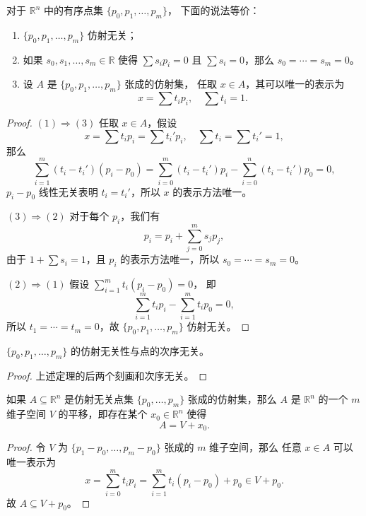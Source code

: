 \documentclass[fontset=none]{Notes}
\begin{document}
\begin{theorem}
  对于 $\mathbb{R}^n$ 中的有序点集 $\{p_0,p_1,\dots,p_m\}$，
  下面的说法等价：
  \begin{enumerate}
    \item $\{p_0,p_1,\dots,p_m\}$ 仿射无关；
    \item 如果 $s_0,s_1,\dots,s_m\in \mathbb{R}$ 使得
    $\sum s_ip_i=0$ 且 $\sum s_i=0$，那么 $s_0=\cdots=s_m=0$。
    \item 设 $A$ 是 $\{p_0,p_1,\dots,p_m\}$ 张成的仿射集，
    任取 $x\in A$，其可以唯一的表示为
    \[
      x=\sum t_ip_i,\quad \sum t_i=1.
    \]
  \end{enumerate}
\end{theorem}
\begin{proof}
  $(1)\Rightarrow (3)$ 任取 $x\in A$，假设
  \[
    x=\sum t_i p_i=\sum t_i'p_i, \quad \sum t_i=\sum t_i'=1,
  \]
  那么
  \[
    \sum_{i=1}^m (t_i-t_i')(p_i-p_0)
    =\sum_{i=0}^m (t_i-t_i')p_i-\sum_{i=0}^n(t_i-t_i')p_0
    =0,
  \]
  $p_i-p_0$ 线性无关表明 $t_i=t_i'$，所以 $x$ 的表示方法唯一。

  $(3)\Rightarrow (2)$ 对于每个 $p_i$，我们有
  \[
    p_i=p_i+\sum_{j=0}^m s_jp_j,
  \]
  由于 $1+\sum s_i=1$，且 $p_i$ 的表示方法唯一，所以
  $s_0=\cdots=s_m=0$。

  $(2)\Rightarrow (1)$ 假设 $\sum_{i=1}^m t_i(p_i-p_0)=0$，
  即
  \[
    \sum_{i=1}^m t_ip_i-\sum_{i=1}^m t_ip_0=0,
  \]
  所以 $t_1=\cdots=t_m=0$，故 $\{p_0,p_1,\dots,p_m\}$ 仿射无关。
\end{proof}

\begin{corollary}
  $\{p_0,p_1,\dots,p_m\}$ 的仿射无关性与点的次序无关。
\end{corollary}
\begin{proof}
  上述定理的后两个刻画和次序无关。
\end{proof}

\begin{corollary}
  如果 $A\subseteq \mathbb{R}^n$ 是仿射无关点集 $\{p_0,\dots,p_m\}$ 
  张成的仿射集，那么 $A$ 是 $\mathbb{R}^n$ 的一个 $m$ 维子空间 $V$
  的平移，即存在某个 $x_0\in \mathbb{R}^n$ 使得
  \[
    A=V+x_0.
  \]
\end{corollary}
\begin{proof}
  令 $V$ 为 $\{p_1-p_0,\dots,p_m-p_0\}$ 张成的 $m$ 维子空间，那么
  任意 $x\in A$ 可以唯一表示为
  \[
    x=\sum_{i=0}^m t_ip_i=\sum_{i=1}^m t_i(p_i-p_0)+p_0\in V+ p_0.
  \]
  故 $A\subseteq V+p_0$。
\end{proof}
\end{document}
